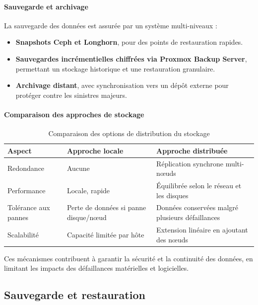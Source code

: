 \paragraph{Sauvegarde et archivage}
La sauvegarde des données est assurée par un système multi-niveaux :
\begin{itemize}
	\item \textbf{Snapshots Ceph et Longhorn}, pour des points de restauration rapides.
	\item \textbf{Sauvegardes incrémentielles chiffrées via Proxmox Backup Server}, permettant un stockage historique et une restauration granulaire.
	\item \textbf{Archivage distant}, avec synchronisation vers un dépôt externe pour protéger contre les sinistres majeurs.
\end{itemize}

\paragraph{Comparaison des approches de stockage}
\begin{table}[H]
	\renewcommand{\arraystretch}{1.3}
	\centering
	\begin{tabular}{|p{4cm}|p{5cm}|p{5cm}|}
		\hline
		\textbf{Aspect}      & \textbf{Approche locale}              & \textbf{Approche distribuée}                     \\
		\hline
		Redondance           & Aucune                                & Réplication synchrone multi-nœuds                \\
		\hline
		Performance          & Locale, rapide                        & Équilibrée selon le réseau et les disques        \\
		\hline
		Tolérance aux pannes & Perte de données si panne disque/nœud & Données conservées malgré plusieurs défaillances \\
		\hline
		Scalabilité          & Capacité limitée par hôte             & Extension linéaire en ajoutant des nœuds         \\
		\hline
	\end{tabular}
	\caption{Comparaison des options de distribution du stockage}
\end{table}

Ces mécanismes contribuent à garantir la sécurité et la continuité des données, en limitant les impacts des défaillances matérielles et logicielles.

\subsection{Sauvegarde et restauration}

